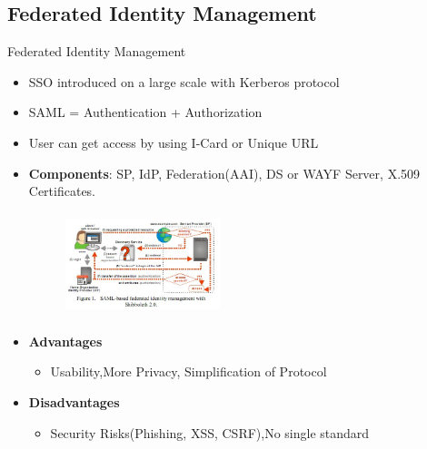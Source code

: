 \documentclass[xcolor=dvipsnames]{beamer}
\begin{document}
\subsection{Federated Identity Management}
\begin{frame}{Federated Identity Management}
\begin{itemize}
\item SSO introduced on a large scale with Kerberos protocol
\item SAML = Authentication + Authorization
\item User can get access by using I-Card or Unique URL
\item \textbf{Components}: SP, IdP, Federation(AAI), DS or WAYF Server, X.509 Certificates.
\begin{figure}
\includegraphics[width=4.5cm,height=3cm]{fidm}
\end{figure}
\item \textbf{Advantages}
\begin{itemize}
	\item Usability,More Privacy, Simplification of Protocol
\end{itemize}
\item \textbf{Disadvantages}
\begin{itemize}
	\item Security Risks(Phishing, XSS, CSRF),No single standard 
\end{itemize}
\end{itemize}
\end{frame}
\end{document}
